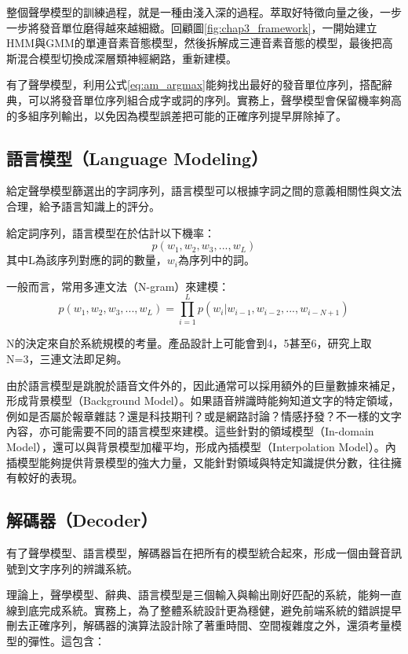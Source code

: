 整個聲學模型的訓練過程，就是一種由淺入深的過程。萃取好特徵向量之後，一步一步將發音單位磨得越來越細緻。回顧圖\ref{fig:chap3_framework}，一開始建立HMM與GMM的單連音素音態模型，然後拆解成三連音素音態的模型，最後把高斯混合模型切換成深層類神經網路，重新建模。

有了聲學模型，利用公式\ref{eq:am_argmax}能夠找出最好的發音單位序列，搭配辭典，可以將發音單位序列組合成字或詞的序列。實務上，聲學模型會保留機率夠高的多組序列輸出，以免因為模型誤差把可能的正確序列提早屏除掉了。

\subsection{語言模型（Language Modeling）}

給定聲學模型篩選出的字詞序列，語言模型可以根據字詞之間的意義相關性與文法合理，給予語言知識上的評分。

給定詞序列，語言模型在於估計以下機率：
\begin{equation}
p( w_1 , w_2 , w_3 , ... , w_L )
\end{equation}
其中L為該序列對應的詞的數量，$w_i$為序列中的詞。

一般而言，常用多連文法（N-gram）來建模：
\begin{equation}
p( w_1 , w_2 , w_3 , ... , w_L ) = \prod_{i = 1}^L p( w_i | w_{i-1} , w_{i-2} , ... , w_{i-N+1} )
\end{equation}

N的決定來自於系統規模的考量。產品設計上可能會到4，5甚至6，研究上取N=3，三連文法即足夠。

由於語言模型是跳脫於語音文件外的，因此通常可以採用額外的巨量數據來補足，形成背景模型（Background Model）。如果語音辨識時能夠知道文字的特定領域，例如是否屬於報章雜誌？還是科技期刊？或是網路討論？情感抒發？不一樣的文字內容，亦可能需要不同的語言模型來建模。這些針對的領域模型（In-domain Model），還可以與背景模型加權平均，形成內插模型（Interpolation Model）。內插模型能夠提供背景模型的強大力量，又能針對領域與特定知識提供分數，往往擁有較好的表現。

\subsection{解碼器（Decoder）}
有了聲學模型、語言模型，解碼器旨在把所有的模型統合起來，形成一個由聲音訊號到文字序列的辨識系統。

理論上，聲學模型、辭典、語言模型是三個輸入與輸出剛好匹配的系統，能夠一直線到底完成系統。實務上，為了整體系統設計更為穩健，避免前端系統的錯誤提早刪去正確序列，解碼器的演算法設計除了著重時間、空間複雜度之外，還須考量模型的彈性。這包含：

